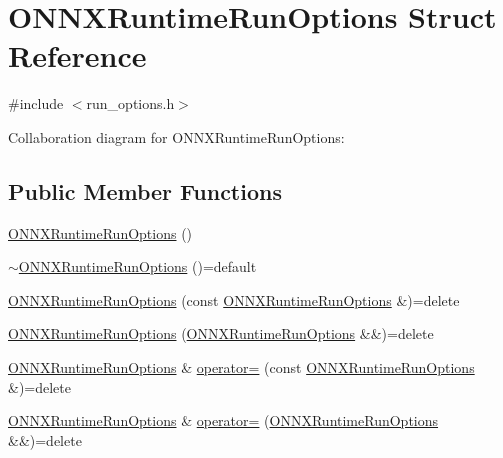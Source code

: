 \hypertarget{structONNXRuntimeRunOptions}{}\section{O\+N\+N\+X\+Runtime\+Run\+Options Struct Reference}
\label{structONNXRuntimeRunOptions}


{\ttfamily \#include $<$run\+\_\+options.\+h$>$}



Collaboration diagram for O\+N\+N\+X\+Runtime\+Run\+Options\+:
\subsection*{Public Member Functions}
\begin{DoxyCompactItemize}
\item 
\mbox{\hyperlink{structONNXRuntimeRunOptions_a58d2e67e2a2bdc71030e77c26fbc60c9}{O\+N\+N\+X\+Runtime\+Run\+Options}} ()
\item 
\mbox{\hyperlink{structONNXRuntimeRunOptions_a7f93c0aea6eaf6a56fb0b219a2e1ec87}{$\sim$\+O\+N\+N\+X\+Runtime\+Run\+Options}} ()=default
\item 
\mbox{\hyperlink{structONNXRuntimeRunOptions_ad267d303ea88aaa8c0409f819cc911ab}{O\+N\+N\+X\+Runtime\+Run\+Options}} (const \mbox{\hyperlink{structONNXRuntimeRunOptions}{O\+N\+N\+X\+Runtime\+Run\+Options}} \&)=delete
\item 
\mbox{\hyperlink{structONNXRuntimeRunOptions_abae5d9608a79288085f57a58db76920e}{O\+N\+N\+X\+Runtime\+Run\+Options}} (\mbox{\hyperlink{structONNXRuntimeRunOptions}{O\+N\+N\+X\+Runtime\+Run\+Options}} \&\&)=delete
\item 
\mbox{\hyperlink{structONNXRuntimeRunOptions}{O\+N\+N\+X\+Runtime\+Run\+Options}} \& \mbox{\hyperlink{structONNXRuntimeRunOptions_a8fecadb5019c62de46f8e2332af74905}{operator=}} (const \mbox{\hyperlink{structONNXRuntimeRunOptions}{O\+N\+N\+X\+Runtime\+Run\+Options}} \&)=delete
\item 
\mbox{\hyperlink{structONNXRuntimeRunOptions}{O\+N\+N\+X\+Runtime\+Run\+Options}} \& \mbox{\hyperlink{structONNXRuntimeRunOptions_a7c5f97969bb3520cb08762246293e3d2}{operator=}} (\mbox{\hyperlink{structONNXRuntimeRunOptions}{O\+N\+N\+X\+Runtime\+Run\+Options}} \&\&)=delete
\end{DoxyCompactItemize}
